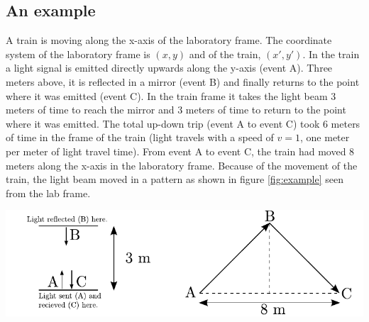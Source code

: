 {\begin{multicols}{2}
\section{An example}
\label{sect:example}

A train is moving along the x-axis of the laboratory frame. The coordinate system of the laboratory frame is $(x,y)$ and of the train, $(x',y')$. In the train a light signal is emitted directly upwards along the y-axis (event A). Three meters above, it is reflected in a mirror (event B) and finally returns to the point where it was emitted (event C). In the train frame it takes the light beam 3 meters of time to reach the mirror and 3 meters of time to return to the point where it was emitted. The total up-down trip (event A to event C) took 6 meters of time in the frame of the train (light travels with a speed of $v=1$, one meter per meter of light travel time). From event A to event C, the train had moved 8 meters along the x-axis in the laboratory frame. Because of the movement of the train, the light beam moved in a pattern as shown in figure \ref{fig:example} seen from the lab frame. 

\begin{Figure}%
\centering
\includegraphics[width=\textwidth]{fig_7-6.pdf}
\end{Figure}


\end{multicols}}
